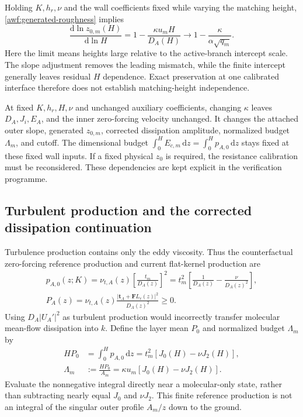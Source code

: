 \documentclass[11pt,a4paper]{article}
\numberwithin{equation}{section}
\newcommand{\dd}{\mathrm d}
\begin{document}
Holding $K,h_r,\nu$ and the wall coefficients fixed while varying the
matching height, \cref{awf:generated-roughness} implies
\begin{equation}
 \boxed{
 \frac{\dd\ln z_{0,m}(H)}{\dd\ln H}
 =1-\frac{\kappa u_m H}{D_A(H)}
 \longrightarrow
 1-\frac{\kappa}{\alpha\sqrt{q_m}}.}
 \label{kap:H-derivative}
\end{equation}
Here the limit means heights large relative to the active-branch
intercept scale. The slope adjustment removes the leading mismatch,
while the finite intercept generally leaves residual $H$ dependence.
Exact preservation at one calibrated interface therefore does not
establish matching-height independence.

At fixed $K,h_r,H,\nu$ and unchanged auxiliary coefficients, changing
$\kappa$ leaves $D_A,J_i,E_A$, and the inner zero-forcing velocity
unchanged. It changes the attached outer slope, generated $z_{0,m}$,
corrected dissipation amplitude, normalized budget $\Lambda_m$, and cutoff.
The dimensional budget $\int_0^H E_{c,m}\,\dd z=\int_0^H p_{A,0}\,\dd z$ stays fixed at these fixed wall inputs.
If a fixed physical $z_0$ is required, the resistance calibration must
be reconsidered. These dependencies are kept explicit in the
verification programme.

\subsection{Turbulent production and the corrected dissipation continuation}
\label{awf:dissipation}

Turbulence production contains only the eddy viscosity. Thus the
counterfactual zero-forcing reference production and current
flat-kernel production are
\begin{align}
 \boxed{p_{A,0}(z;K)
 =\nu_{t,A}(z)\left[\frac{t_m}{D_A(z)}\right]^2
 =t_m^2\left[\frac1{D_A(z)}-\frac{\nu}{D_A(z)^2}\right],}
 \label{awf:reference-production}\\
 \boxed{P_A(z)=\nu_{t,A}(z)
 \frac{|\boldsymbol t_A+\boldsymbol F L_r(z)|^2}{D_A(z)^2}\geq0.}
 \label{awf:current-production}
\end{align}
Using $D_A|U_A'|^2$ as turbulent production would incorrectly
transfer molecular mean-flow dissipation into $k$.
Define the layer mean $P_0$ and normalized budget $\Lambda_m$ by
\begin{equation}
 \begin{aligned}
 HP_0&=\int_0^Hp_{A,0}\,\dd z
     =t_m^2[J_0(H)-\nu J_2(H)],\\
 \Lambda_m&:=\frac{HP_0}{A_m}
     =\kappa u_m[J_0(H)-\nu J_2(H)].
 \end{aligned}
 \label{awf:production-budget}
\end{equation}
Evaluate the nonnegative integral directly near a molecular-only
state, rather than subtracting nearly equal $J_0$ and $\nu J_2$.
This finite reference production is not an integral of the singular
outer profile $A_m/z$ down to the ground.
\end{document}
